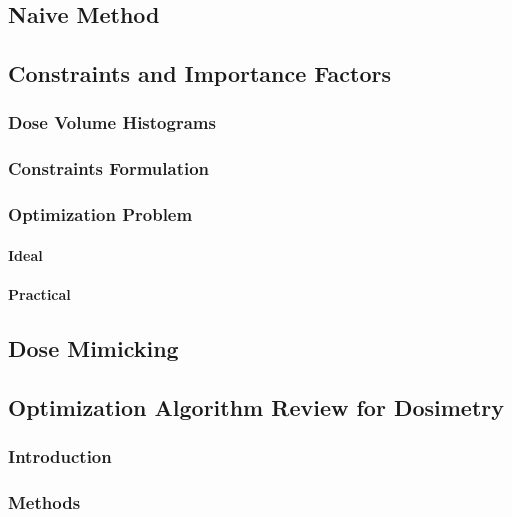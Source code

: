 \subsection{Naive Method}
\subsection{Constraints and Importance Factors}
\subsubsection[DVHs]{Dose Volume Histograms}
\subsubsection{Constraints Formulation}
\subsubsection{Optimization Problem}
\paragraph{Ideal}
\paragraph{Practical}

\subsection{Dose Mimicking}

\subsection{Optimization Algorithm Review for Dosimetry}
\subsubsection{Introduction}

\subsubsection{Methods}

